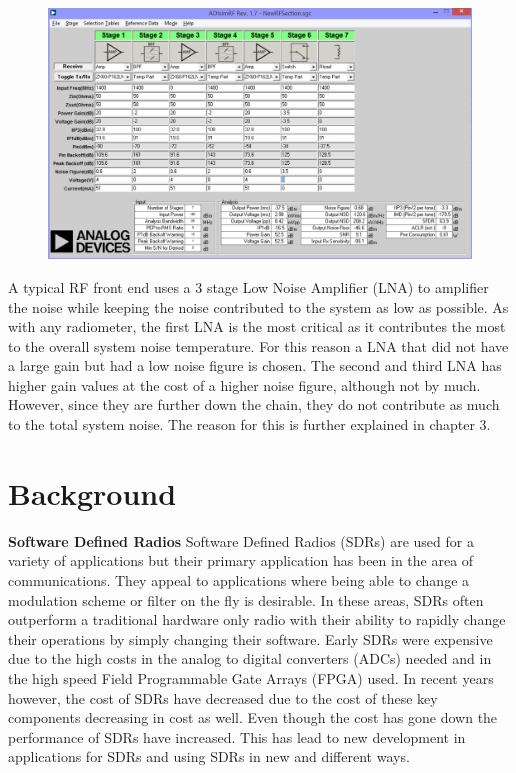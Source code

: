 {\begin{figure}[h!tb] 
\centering
\includegraphics[width=0.8\linewidth]{Images/RF_Front_end.png}
\label{ISU_Rad}
\end{figure}
}
A typical RF front end uses a 3 stage Low Noise Amplifier (LNA) to amplifier the noise while keeping the noise contributed to the system as low as possible.  As with any radiometer, the first LNA is the most critical as it contributes the most to the overall system noise temperature.  For this reason a LNA that did not have a large gain but had a low noise figure is chosen. The second and third LNA has higher gain values at the cost of a higher noise figure, although not by much.  However, since they are further down the chain, they do not contribute as much to the total system noise.  The reason for this is further explained in chapter 3. 

\section{Background}
\textbf{Software Defined Radios} 
Software Defined Radios (SDRs) are used for a variety of applications but their primary application has been in the area of communications.  They appeal to applications where being able to change a modulation scheme or filter on the fly is desirable.  In these areas, SDRs often outperform a traditional hardware only radio with their ability to rapidly change their operations by simply changing their software.  Early SDRs were expensive due to the high costs in the analog to digital converters (ADCs) needed and in the high speed Field Programmable Gate Arrays (FPGA) used.  In recent years however, the cost of SDRs have decreased due to the cost of these key components decreasing in cost as well.  Even though the cost has gone down the performance of SDRs have increased.  This has lead to new development in applications for SDRs  and using SDRs in new and different ways.

